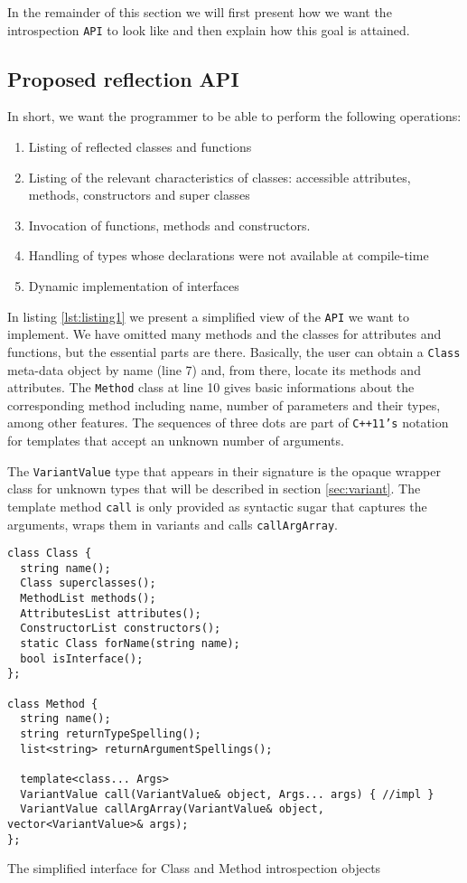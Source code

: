 In the remainder of this section we will first present how we want the introspection \texttt{API} to look like and then explain
how this goal is attained.

\subsection{Proposed reflection API}
\label{proposed}

In short, we want the programmer to be able to perform the following operations:
\begin{enumerate}
 \item Listing of reflected classes and functions
 \item Listing of the relevant characteristics of classes: accessible attributes, methods, constructors and super classes
 \item Invocation of functions, methods and constructors.
 \item Handling of types whose declarations were not available at compile-time
 \item Dynamic implementation of interfaces
\end{enumerate}

In listing \ref{lst:listing1} we present a simplified view of the \texttt{API} we want to implement. We have omitted many methods and the classes for
attributes and functions, but the essential parts are there. Basically, the user can obtain a \texttt{Class} meta-data object by name (line 7) and,
from there, locate its methods and attributes. The \texttt{Method} class at line 10 gives basic informations about the corresponding method including
name, number of parameters and their types, among other features. The sequences of three dots are part of \texttt{C++11's} notation for templates that
accept an unknown number of arguments.

The \texttt{VariantValue} type that appears in their signature is the opaque wrapper class for unknown types that will be described in section \ref{sec:variant}.
The template method \texttt{call} is only provided as syntactic sugar that captures the arguments, wraps them in variants and
calls \texttt{callArgArray}.

\begin{listing}[H]
\begin{verbatim}
class Class {
  string name();
  Class superclasses();
  MethodList methods();
  AttributesList attributes();
  ConstructorList constructors();
  static Class forName(string name);
  bool isInterface();
};

class Method {
  string name();
  string returnTypeSpelling();
  list<string> returnArgumentSpellings();
  
  template<class... Args>
  VariantValue call(VariantValue& object, Args... args) { //impl }
  VariantValue callArgArray(VariantValue& object, vector<VariantValue>& args);
};
\end{verbatim}
\caption{The simplified interface for Class and Method introspection objects}
\label{lst:listing1}
\end{listing}

